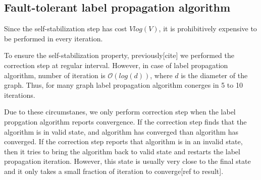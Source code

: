 \subsection{Fault-tolerant label propagation algorithm}

Since the self-stabilization step has cost $Vlog(V)$, it is prohibitively
expensive to be performed in every iteration. 

To ensure the self-stabilization property, previously{[}cite{]} we
performed the correction step at regular interval. However, in case
of label propagation algorithm, number of iteration is $\mathcal{O}(log(d))$,
where $d$ is the diameter of the graph. Thus, for many graph label
propagation algorithm conerges in 5 to 10 iterations. 

Due to these circumstanes, we only perform correction step when the
label propgation algorithm reports convergence. If the correction
step finds that the algorithm is in valid state, and algorithm has
converged than algorithm has converged. If the correction step reports
that algorithm is in an invalid state, then it tries to bring the
algorithm back to valid state and restarts the label propagation iteration.
However, this state is usually very close to the final state and it
only takes a small fraction of iteration to converge{[}ref to result{]}. 
